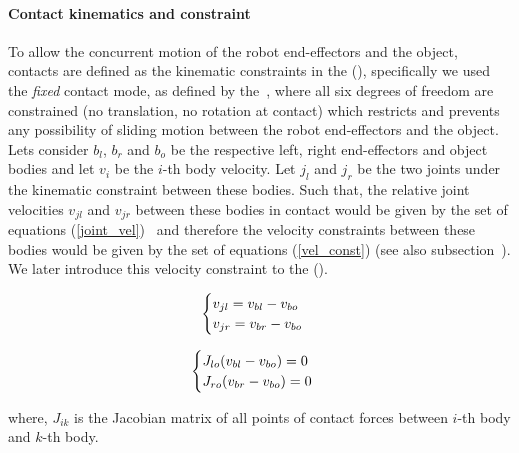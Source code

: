
\paragraph*{Contact kinematics and constraint}

To allow the concurrent motion of the robot end-effectors and the object, contacts are defined as the kinematic constraints in the (), specifically we used the \textit{fixed} contact mode, as defined by the~\cite{balkcom2002computing}, where all six degrees of freedom are constrained (no translation, no rotation at contact) which restricts and prevents any possibility of sliding motion between the robot end-effectors and the object. Lets consider $b_{l}$, $b_{r}$ and $b_o$ be the respective left, right end-effectors and object bodies and let $v_i$ be the $i$-th body velocity. Let $j_l$ and $j_r$ be the two joints under the kinematic constraint between these bodies. Such that, the relative joint velocities $v_{jl}$ and $v_{jr}$ between these bodies in contact would be given by the set of equations (\ref{joint_vel})~\cite{Featherstone:1987} and therefore the velocity constraints between these bodies would be given by the set of equations (\ref{vel_const}) \cite{ohwovoriole1980externsion} (see also subsection~). We later introduce this velocity constraint to the ().

\begin{equation}\label{joint_vel}
\centering
\begin{cases}
v_{jl} = v_{bl} - v_{bo} \\
v_{jr} = v_{br} - v_{bo} \\
\end{cases}
\end{equation}

\begin{equation}\label{vel_const}
\centering
\begin{cases}
J_{lo}(v_{bl} - v_{bo}) = 0\\
J_{ro}(v_{br} - v_{bo}) = 0\\
\end{cases}
\end{equation}

where, $J_{ik}$ is the Jacobian matrix of all points of contact forces between $i$-th body and $k$-th body.


